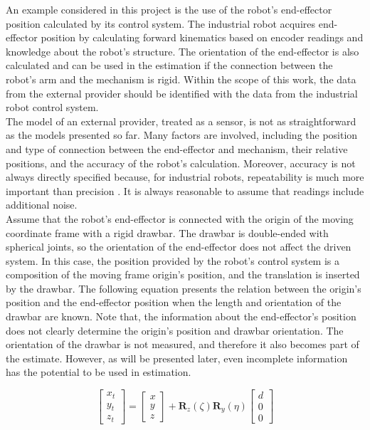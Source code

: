 An example considered in this project is the use of the robot's end-effector position calculated by its control system. The industrial robot acquires end-effector position by calculating forward kinematics based on encoder readings and knowledge about the robot's structure. The orientation of the end-effector is also calculated and can be used in the estimation if the connection between the robot's arm and the mechanism is rigid. Within the scope of this work, the data from the external provider should be identified with the data from the industrial robot control system.\\

The model of an external provider, treated as a sensor, is not as straightforward as the models presented so far. Many factors are involved, including the position and type of connection between the end-effector and mechanism, their relative positions, and the accuracy of the robot’s calculation. Moreover, accuracy is not always directly specified because, for industrial robots, repeatability is much more important than precision \cite{shiakolas2002accuracy}. It is always reasonable to assume that readings include additional noise.\\

Assume that the robot's end-effector is connected with the origin of the moving coordinate frame with a rigid drawbar. The drawbar is double-ended with spherical joints, so the orientation of the end-effector does not affect the driven system. In this case, the position provided by the robot's control system is a composition of the moving frame origin's position, and the translation is inserted by the drawbar. The following equation presents the relation between the origin's position and the end-effector position when the length and orientation of the drawbar are known. Note that, the information about the end-effector's position does not clearly determine the origin's position and drawbar orientation. The orientation of the drawbar is not measured, and therefore it also becomes part of the estimate. However, as will be presented later, even incomplete information has the potential to be used in estimation.

\begin{equation}
	\begin{bmatrix}
		x_t \\ y_t \\ z_t 
	\end{bmatrix}
	=
	\begin{bmatrix}
		x \\ y \\ z 
	\end{bmatrix}
	+
	\bm{R}_z \left( \zeta \right)
	\bm{R}_y \left( \eta \right)
	\begin{bmatrix}
		d \\ 0 \\ 0 
	\end{bmatrix}
	\label{drawbar_model}
\end{equation}

